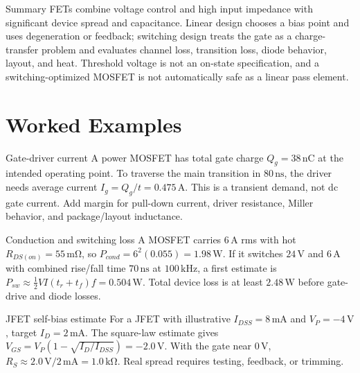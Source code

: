 \documentclass[10pt,letterpaper]{article}
\begin{document}
\begin{CornellSummaryBox}{Summary}
FETs combine voltage control and high input impedance with significant device spread and capacitance. Linear design chooses a bias point and uses degeneration or feedback; switching design treats the gate as a charge-transfer problem and evaluates channel loss, transition loss, diode behavior, layout, and heat. Threshold voltage is not an on-state specification, and a switching-optimized MOSFET is not automatically safe as a linear pass element.
\end{CornellSummaryBox}
\section{Worked Examples}
\begin{CornellExamBox}{Gate-driver current}
A power MOSFET has total gate charge $Q_g=38\,\mathrm{nC}$ at the intended operating point. To traverse the main transition in $80\,\mathrm{ns}$, the driver needs average current $I_g=Q_g/t=0.475\,\mathrm{A}$. This is a transient demand, not dc gate current. Add margin for pull-down current, driver resistance, Miller behavior, and package/layout inductance.
\end{CornellExamBox}
\begin{CornellExamBox}{Conduction and switching loss}
A MOSFET carries $6\,\mathrm{A}$ rms with hot $R_{DS(on)}=55\,\mathrm{m\Omega}$, so $P_{cond}=6^2(0.055)=1.98\,\mathrm{W}$. If it switches $24\,\mathrm{V}$ and $6\,\mathrm{A}$ with combined rise/fall time $70\,\mathrm{ns}$ at $100\,\mathrm{kHz}$, a first estimate is $P_{sw}\approx\tfrac12VI(t_r+t_f)f=0.504\,\mathrm{W}$. Total device loss is at least $2.48\,\mathrm{W}$ before gate-drive and diode losses.
\end{CornellExamBox}
\begin{CornellExamBox}{JFET self-bias estimate}
For a JFET with illustrative $I_{DSS}=8\,\mathrm{mA}$ and $V_P=-4\,\mathrm{V}$, target $I_D=2\,\mathrm{mA}$. The square-law estimate gives $V_{GS}=V_P(1-\sqrt{I_D/I_{DSS}})=-2.0\,\mathrm{V}$. With the gate near $0\,\mathrm{V}$, $R_S\approx2.0\,\mathrm{V}/2\,\mathrm{mA}=1.0\,\mathrm{k\Omega}$. Real spread requires testing, feedback, or trimming.
\end{CornellExamBox}
\end{document}
